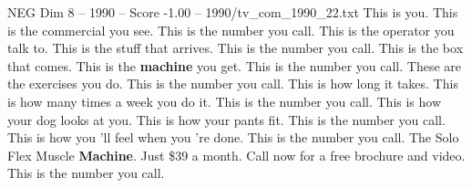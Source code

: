 \begin{textsample}{NEG Dim 8 – 1990 – Score -1.00 – 1990/tv\_com\_1990\_22.txt}  \label{ex:f8_neg_029}
This is you.
This is the commercial you see.
This is the number you call.
This is the operator you talk to.
This is the stuff that arrives.
This is the number you call.
This is the box that comes.
This is the \textbf{machine} you get.
This is the number you call.
These are the exercises you do.
This is the number you call.
This is how long it takes.
This is how many times a week you do it.
This is the number you call.
This is how your dog looks at you.
This is how your pants fit.
This is the number you call.
This is how you 'll feel when you 're done.
This is the number you call.
The Solo Flex Muscle \textbf{Machine}.
Just \$39 a month.
Call now for a free brochure and video.
This is the number you call.

\end{textsample}
